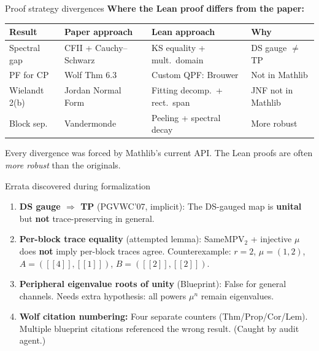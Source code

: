 \documentclass[aspectratio=169,10pt]{beamer}
\begin{document}
\begin{frame}{Proof strategy divergences}
    \vspace{-0.2em}
    \textcolor{amber}{\textbf{Where the Lean proof differs from the paper:}}
    \vspace{0.3em}
    \begin{center}
    \renewcommand{\arraystretch}{1.15}
    {\footnotesize
    \begin{tabular}{@{}p{2.2cm} p{3.2cm} p{3.5cm} p{3cm}@{}}
        \toprule
        \textbf{Result} & \textbf{Paper approach} & \textbf{Lean approach} & \textbf{Why} \\
        \midrule
        Spectral gap & CFII + Cauchy--Schwarz & KS equality + mult.\ domain & DS gauge $\neq$ TP \\
        PF for CP & Wolf Thm 6.3 & Custom QPF: Brouwer & Not in Mathlib \\
        Wielandt 2(b) & Jordan Normal Form & Fitting decomp.\ + rect.\ span & JNF not in Mathlib \\
        Block sep. & Vandermonde & Peeling + spectral decay & More robust \\
        \bottomrule
    \end{tabular}
    }
    \end{center}
    \vspace{0.4em}
    \textcolor{dimwhite}{\footnotesize Every divergence was forced by Mathlib's current API. The Lean proofs are often \emph{more robust} than the originals.}
\end{frame}

\begin{frame}{Errata discovered during formalization}
    \vspace{-0.4em}
    \begin{enumerate}
        \item \textcolor{softred}{\textbf{DS gauge $\Rightarrow$ TP} (PGVWC'07, implicit):} The DS-gauged map is \textbf{unital} but \textbf{not} trace-preserving in general.
        \item \textcolor{softred}{\textbf{Per-block trace equality} (attempted lemma):} SameMPV$_2$ + injective $\mu$ does \textbf{not} imply per-block traces agree. Counterexample: $r\!=\!2$, $\mu\!=\!(1,2)$, $A\!=\!([[4]],[[1]])$, $B\!=\!([[2]],[[2]])$.
        \item \textcolor{softred}{\textbf{Peripheral eigenvalue roots of unity} (Blueprint):} False for general channels. Needs extra hypothesis: all powers $\mu^n$ remain eigenvalues.
        \item \textcolor{amber}{\textbf{Wolf citation numbering:}} Four separate counters (Thm/Prop/Cor/Lem). Multiple blueprint citations referenced the wrong result. {\scriptsize(Caught by audit agent.)}
    \end{enumerate}
\end{frame}
\end{document}
